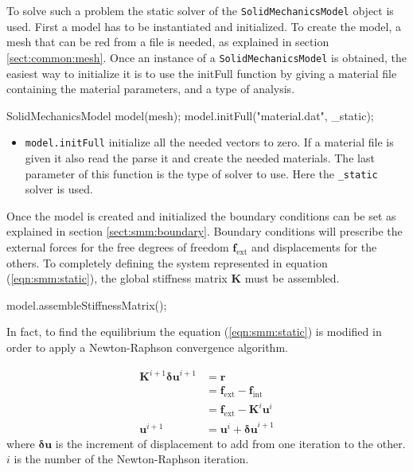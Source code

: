 \documentclass[a4paper,11pt]{book}
\newcommand{\code}[1]{\texttt{#1}}
\renewcommand{\vec}[1]{\ensuremath{\boldsymbol{#1}}}
\newcommand{\mat}[1]{\ensuremath{\boldsymbol{#1}}}
\newcommand{\st}[1]{{\mathrm{#1}}}
\begin{document}
To     solve    such     a    problem     the    static     solver     of    the
\code{SolidMechanicsModel}  object is used.   First a
model has to be instantiated and  initialized.  To create the model, a mesh that
can   be   red   from   a   file   is   needed,   as   explained   in   section
\ref{sect:common:mesh}.   Once an  instance of  a  \code{SolidMechanicsModel} is
obtained,   the    easiest   way    to   initialize   it    is   to    use   the
initFull function by  giving a material file
containing the material parameters, and a type of analysis.

\begin{cpp}
  SolidMechanicsModel model(mesh);
  model.initFull("material.dat", _static);
\end{cpp}


\begin{itemize}
\item  \code{model.initFull} initialize  all the  needed vectors  to zero.  If a
  material  file is  given  it also  read the  parse  it and  create the  needed
  materials.  The last  parameter of  this  function is  the type  of solver  to
  use. Here the \code{\_static} solver is used.
\end{itemize}


Once the model is created and  initialized the boundary conditions can be set as
explained   in  section   \ref{sect:smm:boundary}.   Boundary   conditions  will
prescribe   the   external   forces    for   the   free   degrees   of   freedom
$\vec{f_{\st{ext}}}$ and  displacements for the others.   To completely defining
the system represented in  equation (\ref{eqn:smm:static}), the global stiffness
matrix            $\mat{K}$             must            be            assembled.

\begin{cpp}
  model.assembleStiffnessMatrix();
\end{cpp}

In fact, to find the equilibrium the equation (\ref{eqn:smm:static}) is modified
in order to apply a Newton-Raphson convergence algorithm.

\begin{align}\label{eqn:smm:static-newton-raphson}
  \mat{K}^{i+1} \vec{\delta u}^{i+1} &= \vec{r} \\
  &= \vec{f_{\st{ext}}} - \vec{f_{\st{int}}}\\
  &= \vec{f_{\st{ext}}} - \mat{K}^{i} \vec{u}^{i}\\
  \vec{u}^{i+1} &= \vec{u}^{i} + \vec{\delta u}^{i+1}\nonumber
\end{align}
where  $\vec{\delta  u}$ is  the  increment of  displacement  to  add from  one
iteration to the other. $i$ is the number of the Newton-Raphson iteration.
\end{document}
